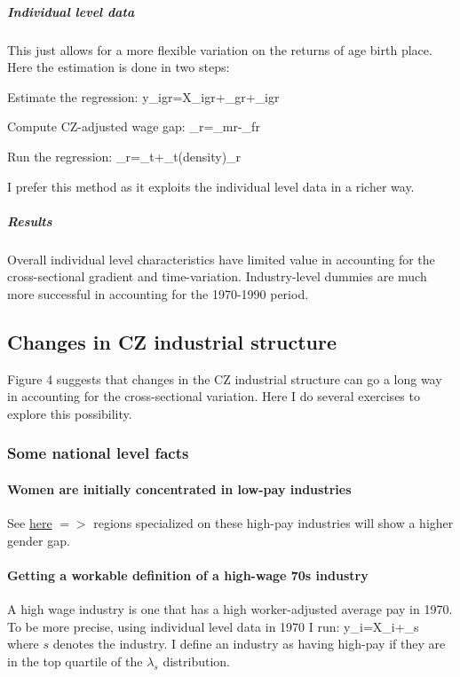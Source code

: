 \subparagraph{Individual level data}
This just allows for a more flexible variation on the returns of age birth place. Here the estimation is done in two steps:
\benu
	\item Estimate the regression:
	\beqn
		y_{igr}=X_{igr}\gamma+\lambda_{gr}+\varepsilon_{igr}
	\eeqn
	\item Compute CZ-adjusted wage gap:
	\beqns
		\tau_r=\lambda_{mr}-\lambda_{fr}
	\eeqns
	\item Run the regression:
	\beqns
	\tau_r=\alpha_t+\beta_t\log(density)_r
	\eeqns
\eenu

I prefer this method as it exploits the individual level data in a richer way.


\subparagraph{Results} 
 Overall individual level characteristics have limited value in accounting for the cross-sectional gradient and time-variation. Industry-level dummies are much more successful in accounting for the 1970-1990 period.


\FloatBarrier

\FloatBarrier




\subsection{Changes in CZ industrial structure}
Figure 4 suggests that changes in the CZ industrial structure can go a long way in accounting for the cross-sectional variation. Here I do several exercises to explore this possibility.

\subsubsection{Some national level facts}
\paragraph{Women are initially concentrated in low-pay industries}
See \href{https://www.dropbox.com/s/lfpo3q5i9mvq8ry/employment_distribution_gender_full_time.png?dl=0}{here} $=> $ regions specialized on these high-pay industries will show a higher gender gap.


\paragraph{Getting a workable definition of a high-wage 70s industry}
A high wage industry is one that has a high worker-adjusted average pay in 1970. To be more precise, using individual level data in 1970 I run:
\beqn
y_{i}=X_{i}\beta+\lambda_{s}
\eeqn
where $s$ denotes the industry.  I define an industry as having high-pay if they are in the top quartile of the $\lambda_{s}$ distribution.

